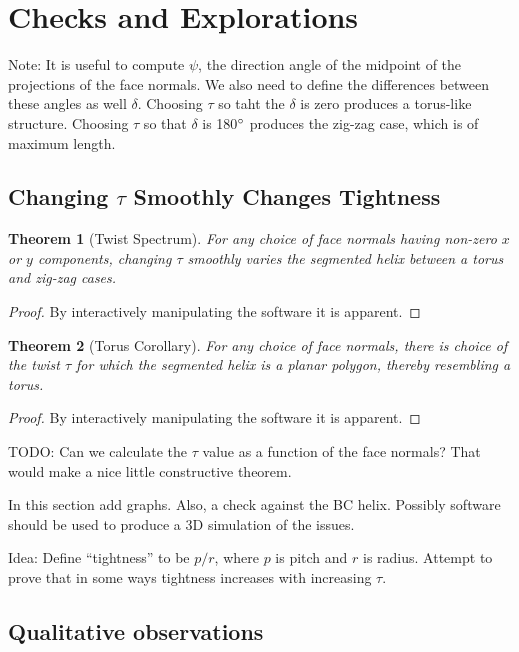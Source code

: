 \documentclass[11pt]{article}
\newtheorem{theorem}{Theorem}
\begin{document}
{\section{Checks and Explorations}

Note: It is useful to compute $\psi$, the direction angle of
the midpoint of the projections of the face normals.
We also need to define the differences between these angles
as well $\delta$.
Choosing $\tau$ so taht the $\delta$ is zero produces a torus-like
structure. Choosing $\tau$ so that $\delta$ is 180$\degree$ produces
the zig-zag case, which is of maximum length.


\subsection{Changing $\tau$ Smoothly Changes Tightness}

\begin{theorem}[Twist Spectrum]
  For any choice of face normals having non-zero $x$ or $y$ components, changing $\tau$ smoothly varies the segmented helix
  between a torus and zig-zag cases.
  \end{theorem}

\begin{proof}
  By interactively manipulating the software it is apparent.
  \end{proof}

\begin{theorem}[Torus Corollary]
  For any choice of face normals, there is choice of the twist $\tau$ for which the segmented helix is a planar polygon,
  thereby resembling a torus.
  \end{theorem}

\begin{proof}
  By interactively manipulating the software it is apparent.
  \end{proof}

TODO: Can we calculate the $\tau$ value as a function of the face normals? That would make a nice little constructive theorem.


In this section add graphs. Also, a check against the BC helix.
Possibly software should be used to produce a 3D simulation
of the issues.

Idea: Define ``tightness'' to be $ p / r$, where $p$ is pitch and $r$ is radius. Attempt to prove that in some ways tightness increases with increasing $\tau$.

\subsection{Qualitative observations}

}
\end{document}
